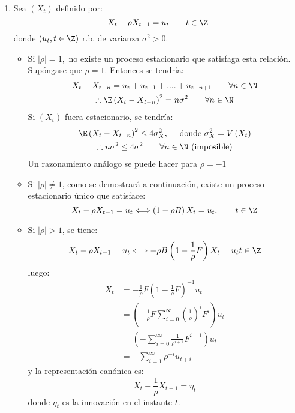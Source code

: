 \begin{ejemplo}
\begin{enumerate}
\begin{proof}[Resoluci\'{o}n]
\begin{enumerate}
Si $\varphi_{2} =$ -0,025, se obtiene la ecuaci\'{o}n asociada al polinomio autoregresivo.
\[
\varphi(z)=1-0,8z + 0,02z^{{2 }}\Leftrightarrow 
z_{{1}}=38,70 z_{{2}}=1,292
\]
Puesto que las dos ra\'{i}ces son de $\left| \right|<1$, el proceso es estacionario. As\'{i}, entonces, $\varphi_{2}= -0,025$.\qedhere
\end{enumerate} 
\end{proof}

\item Sea $\left( {X_{t} } \right)$ definido por:
\[
X_{t} -\rho X_{t-1} =u_{t} 
\qquad
t\in \Z
\]
donde $\left( {u_{t} ,t\in \Z} \right)$ r.b. de varianza $\sigma^{2}>0$.

\begin{itemize}
\item Si $\left| \rho \right|=1,$ no existe un proceso estacionario que satisfaga esta relaci\'{o}n. Sup\'{o}ngase que $\rho =1$. Entonces se tendr\'{i}a:
\begin{gather*}
X_{t} -X_{t-n} =u_{t} +u_{t-1} +....+u_{t-n+1} \qquad\forall n\in \N\\
\therefore\E\left( {X_{t} -X_{t-n} } \right)^{2}=n\sigma^{2}\qquad\forall n\in \N
\end{gather*}
Si $\left( {X_{t} } \right)$ fuera estacionario, se tendr\'{i}a:
\begin{gather*}
\E\left( {X_{t} -X_{t-n} } \right)^{2}\le 4\sigma_{X}^{2} ,\quad\text{ donde }\sigma_{X}^{2} =V\left( {X_{t} } \right) \\
\therefore n\sigma^{2}\le 4\sigma^{2} \qquad \forall n\in \N \text{ (imposible)}
\end{gather*}
Un razonamiento an\'{a}logo se puede hacer para $\rho =-1$

\item Si $\left| \rho \right|\ne 1$, como se demostrar\'{a} a continuaci\'{o}n, existe un proceso estacionario \'{u}nico que satisface:
\[
X_{t} -\rho X_{t-1} =u_{t} 
\Longleftrightarrow \left( {1-\rho B} \right)X_{t} =u_{t},\qquad t\in \Z
\]

\item Si $\left| \rho \right|>1$, se tiene:
\[
X_{t} -\rho X_{t-1} =u_{t} 
\Longleftrightarrow -\rho B\left( {1-\frac{1}{\rho }F} \right)X_{t} =u_{t} t\in \Z
\]
luego:
\begin{align*}
X_{t} 
	&=-\frac{1}{\rho }F\left( {1-\frac{1}{\rho }F} \right)^{-1}u_{t} \\
	&=\left( {-\frac{1}{\rho }F\sum_{i=0}^\infty {\left( {\frac{1}{\rho }} \right)^{i}F^{i}} } \right)u_{t}\\
	&=\left( {-\sum_{i=0}^\infty {\frac{1}{\rho^{i+1}}F^{i+1}} } \right)u_{t}  \\
	&=-\sum_{i=1}^\infty {\rho^{-i}u_{t+i} } 
\end{align*}
y la representaci\'{o}n can\'{o}nica es:
\[
X_{t} -\frac{1}{\rho }X_{t-1} =\eta_{t} 
\]
donde $\eta_{t} $ es la innovaci\'{o}n en el instante $t$.


\end{itemize}
\end{enumerate}
\end{ejemplo}
